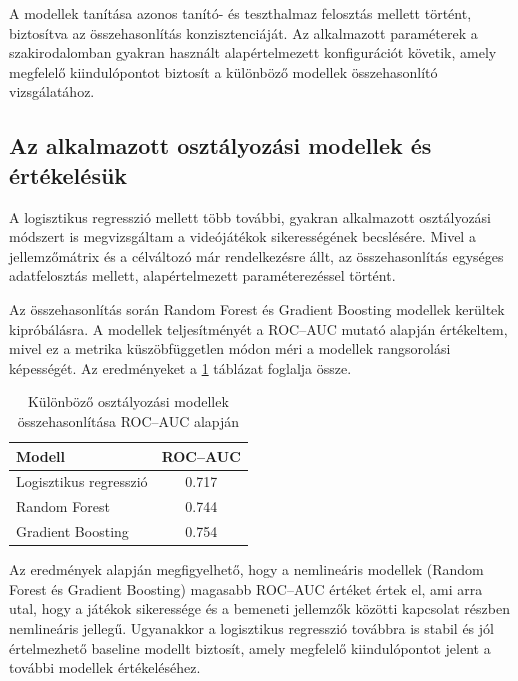 A modellek tanítása azonos tanító- és teszthalmaz felosztás mellett történt,
biztosítva az összehasonlítás konzisztenciáját.
Az alkalmazott paraméterek a szakirodalomban gyakran használt
alapértelmezett konfigurációt követik, amely megfelelő kiindulópontot
biztosít a különböző modellek összehasonlító vizsgálatához.


\subsection{Az alkalmazott osztályozási modellek és értékelésük}

A logisztikus regresszió \cite{logistic regression} mellett több további, gyakran alkalmazott osztályozási módszert is
megvizsgáltam a videójátékok sikerességének becslésére.
Mivel a jellemzőmátrix és a célváltozó már rendelkezésre állt, az összehasonlítás egységes
adatfelosztás mellett, alapértelmezett paraméterezéssel történt.

Az összehasonlítás során Random Forest \cite{random forest} és Gradient Boosting \cite{gradient boosting} modellek kerültek kipróbálásra.
A modellek teljesítményét a ROC--AUC \cite{roc-auc} mutató alapján értékeltem, mivel ez a metrika
küszöbfüggetlen módon méri a modellek rangsorolási képességét.
Az eredményeket a \ref{tab:model_comparison} táblázat foglalja össze.

\begin{table}[h]
    \centering
    \caption{Különböző osztályozási modellek összehasonlítása ROC--AUC alapján}
    \label{tab:model_comparison}
    \begin{tabular}{l c}
        \hline
        \textbf{Modell} & \textbf{ROC--AUC} \\
        \hline
        Logisztikus regresszió & 0.717 \\
        Random Forest & 0.744 \\
        Gradient Boosting & 0.754 \\
        \hline
    \end{tabular}
\end{table}

Az eredmények alapján megfigyelhető, hogy a nemlineáris modellek
(Random Forest és Gradient Boosting) magasabb ROC--AUC értéket értek el,
ami arra utal, hogy a játékok sikeressége és a bemeneti jellemzők közötti kapcsolat
részben nemlineáris jellegű.
Ugyanakkor a logisztikus regresszió továbbra is stabil és jól értelmezhető baseline modellt
biztosít, amely megfelelő kiindulópontot jelent a további modellek értékeléséhez.

